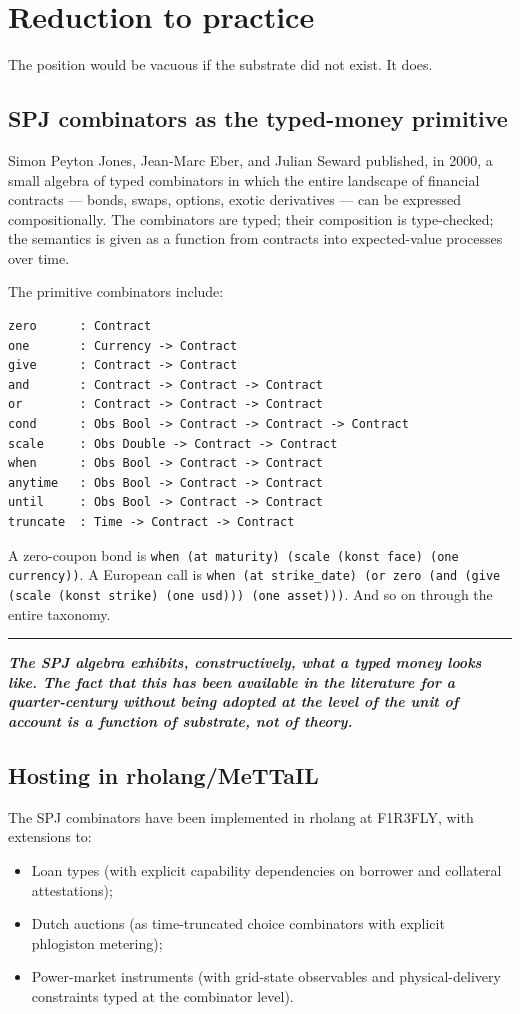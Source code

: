 \documentclass[11pt]{article}
\newcommand{\position}[1]{%
  \medskip
  \begin{quoting}[indentfirst=false, leftmargin=1em, rightmargin=1em]
  \noindent\textcolor{rhosky}{\rule{3pt}{1.2em}}\hspace{0.5em}\textbf{\textit{#1}}
  \end{quoting}
  \medskip
}
\begin{document}
\section{Reduction to practice}

The position would be vacuous if the substrate did not exist. It does.

\subsection{SPJ combinators as the typed-money primitive}\label{sec:spj}

Simon Peyton Jones, Jean-Marc Eber, and Julian Seward published, in 2000, a small algebra of typed combinators in which the entire landscape of financial contracts --- bonds, swaps, options, exotic derivatives --- can be expressed compositionally. The combinators are typed; their composition is type-checked; the semantics is given as a function from contracts into expected-value processes over time.

The primitive combinators include:
\begin{lstlisting}[language=rholang]
zero      : Contract
one       : Currency -> Contract
give      : Contract -> Contract
and       : Contract -> Contract -> Contract
or        : Contract -> Contract -> Contract
cond      : Obs Bool -> Contract -> Contract -> Contract
scale     : Obs Double -> Contract -> Contract
when      : Obs Bool -> Contract -> Contract
anytime   : Obs Bool -> Contract -> Contract
until     : Obs Bool -> Contract -> Contract
truncate  : Time -> Contract -> Contract
\end{lstlisting}

A zero-coupon bond is \texttt{when (at maturity) (scale (konst face) (one currency))}. A European call is \texttt{when (at strike\_date) (or zero (and (give (scale (konst strike) (one usd))) (one asset)))}. And so on through the entire taxonomy.

\position{The SPJ algebra exhibits, constructively, what a typed money looks like. The fact that this has been available in the literature for a quarter-century without being adopted at the level of the unit of account is a function of substrate, not of theory.}

\subsection{Hosting in rholang/MeTTaIL}

The SPJ combinators have been implemented in rholang at F1R3FLY, with extensions to:
\begin{itemize}[leftmargin=*]
\item Loan types (with explicit capability dependencies on borrower and collateral attestations);
\item Dutch auctions (as time-truncated choice combinators with explicit phlogiston metering);
\item Power-market instruments (with grid-state observables and physical-delivery constraints typed at the combinator level).
\end{itemize}
\end{document}
